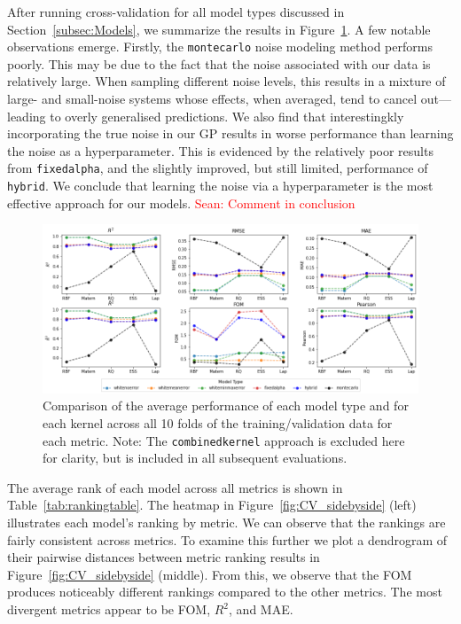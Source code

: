 \documentclass[12pt]{article}
\newcommand{\Sean}[1]{{\textcolor{red}{{Sean: #1}} }}
\begin{document}
After running cross-validation for all model types discussed in Section~\ref{subsec:Models}, we summarize the results in Figure~\ref{fig:broad_comparison}. A few notable observations emerge. Firstly, the \texttt{montecarlo} noise modeling method performs poorly.
This may be due to the fact that the noise associated with our data is relatively large. When sampling different noise levels, this results in a mixture of large- and small-noise systems whose effects, when averaged, tend to cancel out—leading to overly generalised predictions.
We also find that interestingkly incorporating the true noise in our GP results in worse performance than learning the noise as a hyperparameter.
This is evidenced by the relatively poor results from \texttt{fixedalpha}, and the slightly improved, but still limited, performance of \texttt{hybrid}.
We conclude that learning the noise via a hyperparameter is the most effective approach for our models. \Sean{Comment in conclusion}
\begin{figure}[H]
    \centering
    \includegraphics[width=\textwidth]{LatexPlots/CV_plots/metrics_compared.png}
    \caption{Comparison of the average performance of each model type and for each kernel across all 10 folds of the training/validation data for each metric. Note: The \texttt{combinedkernel} approach is excluded here for clarity, but is included in all subsequent evaluations.}
    \label{fig:broad_comparison}
\end{figure}
The average rank of each model across all metrics is shown in Table~\ref{tab:rankingtable}. The heatmap in Figure~\ref{fig:CV_sidebyside} (left) illustrates each model's ranking by metric. We can observe that the rankings are fairly consistent across metrics.
To examine this further we plot a dendrogram of their pairwise distances between metric ranking results in Figure~\ref{fig:CV_sidebyside} (middle). From this, we observe that the FOM produces noticeably different rankings compared to the other metrics. The most divergent metrics appear to be FOM, \(R^2\), and MAE.
\end{document}
